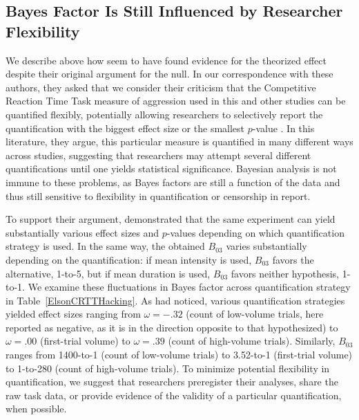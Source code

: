 \documentclass[man]{apa6}
\begin{document}
\subsection{Bayes Factor Is Still Influenced by Researcher Flexibility} 
We describe above how \citet{Elson:etal:2013} seem to have found evidence for the theorized effect despite their original argument for the null. In our correspondence with these authors, they asked that we consider their criticism that the Competitive Reaction Time Task measure of aggression used in this and other studies can be quantified flexibly, potentially allowing researchers to selectively report the quantification with the biggest effect size or the smallest $p$-value \citep{Elson:etal:2014}. In this literature, they argue, this particular measure is quantified in many different ways across studies, suggesting that researchers may attempt several different quantifications until one yields statistical significance. Bayesian analysis is not immune to these problems, as Bayes factors are still a function of the data and thus still sensitive to flexibility in quantification or censorship in report. 

To support their argument, \citet{Elson:etal:2014} demonstrated that the same experiment can yield substantially various effect sizes and $p$-values depending on which quantification strategy is used. In the same way, the obtained $B_{03}$ varies substantially depending on the quantification: if mean intensity is used, $B_{03}$ favors the alternative, 1-to-5, but if mean duration is used, $B_{03}$ favors neither hypothesis, 1-to-1. We examine these fluctuations in Bayes factor across quantification strategy in Table~\ref{ElsonCRTTHacking}.  As \citet{Elson:etal:2014} had noticed, various quantification strategies yielded effect sizes ranging from $\omega = -.32$ (count of low-volume trials, here reported as negative, as it is in the direction opposite to that hypothesized) to $\omega = .00$ (first-trial volume) to $\omega = .39$ (count of high-volume trials). Similarly, $B_{03}$ ranges from 1400-to-1 (count of low-volume trials) to 3.52-to-1 (first-trial volume) to 1-to-280 (count of high-volume trials). To minimize potential flexibility in quantification, we suggest that researchers preregister their analyses, share the raw task data, or provide evidence of the validity of a particular quantification, when possible. 
\end{document}
